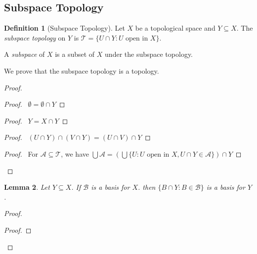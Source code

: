 \documentclass{book}
\newtheorem{lm}{Lemma}[chapter]
\theoremstyle{definition}
\newtheorem{df}[lm]{Definition}
\begin{document}
  \subsection{Subspace Topology}
  
  \begin{df}[Subspace Topology]
    Let $X$ be a topological space and $Y \subseteq X$. The \emph{subspace 
      topology} on $Y$ is $\mathcal{T} = \{ U \cap Y : U \text{ open in } X \}$.
    
    A \emph{subspace} of $X$ is a subset of $X$ under the subspace topology.
    
    We prove that the subspace topology is a topology.
  \end{df}
  
  \begin{proof}
    \begin{proof}
      \pf\ $\emptyset = \emptyset \cap Y$
    \end{proof}
    \begin{proof}
      \pf\ $Y = X \cap Y$
    \end{proof}
    \begin{proof}
      \pf\ $(U \cap Y) \cap (V \cap Y) = (U \cap V) \cap Y$
    \end{proof}
    \begin{proof}
      \pf\ For $\mathcal{A} \subseteq \mathcal{T}$, we have $\bigcup \mathcal{A} 
      = 
      (\bigcup \{ U : U \text{ open in } X, U \cap Y \in \mathcal{A} \}) \cap Y$
    \end{proof}
  \end{proof}
  
  \begin{lm}
    \label{lm:topology:subspace:basis}
    Let $Y \subseteq X$. If $\mathcal{B}$ is a basis for $X$. then $\{ B \cap Y 
    : 
    B \in \mathcal{B} \}$ is a basis for $Y$.
  \end{lm}
  
  \begin{proof}
    \begin{proof}
    \end{proof}
  \end{proof}
  
\end{document}
